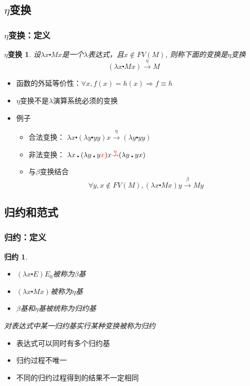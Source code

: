 \documentclass[CJK,compress,hyperref]{beamer}
\begin{document}
\begin{CJK}{UTF8}{song}
\subsection{ $\eta$变换}
\begin{frame}
  \frametitle{$\eta$变换：定义} 
  \newtheorem{etaRed}{$\eta$变换} 
  \begin{etaRed}
    设$\lambda x \centerdot Mx$是一个$\lambda$表达式，且$x \not \in FV(M)$, 则称下面的变换是{\color{red}$\eta$变换}
    \begin{displaymath}
      (\lambda x \centerdot Mx) \stackrel{\eta}{\longrightarrow} M 
    \end{displaymath} 
  \end{etaRed}
  \begin{itemize}
  \item 函数的外延等价性：$\forall x, f(x) = h(x) \Longrightarrow f \equiv h$  
  \item $\eta$变换不是$\lambda$演算系统必须的变换 
  \item 例子 
    \begin{itemize}
    \item{合法变换：} $\lambda x \centerdot (\lambda y \centerdot yy) x \stackrel{\eta}{\longrightarrow}(\lambda y \centerdot yy)$ 
    \item{非法变换：}  $\lambda x \centerdot (\lambda y \centerdot y{\color{red}x}) x {\color{red}\stackrel{\eta}{\nrightarrow}} (\lambda y \centerdot yx) $
    \item 与$\beta$变换结合
      \begin{displaymath}
        \forall y, x \not \in FV(M), (\lambda x \centerdot Mx)y \stackrel{\beta}{\longrightarrow} My
      \end{displaymath}
    \end{itemize}
  \end{itemize}
\end{frame} 

\subsection{ 归约和范式}
\begin{frame}
  \frametitle{归约：定义} 
  \newtheorem{reduction}{归约} 
  \begin{reduction} 
    \begin{itemize}
    \item $(\lambda x \centerdot E)E_0$被称为$\beta$基
    \item $(\lambda x \centerdot Mx)$被称为$\eta$基
    \item $\beta$基和$\eta$基被统称为归约基 
    \end{itemize} 
    对表达式中某一归约基实行某种变换被称为{\color{red}归约}
  \end{reduction} 
  \begin{itemize}
  \item 表达式可以同时有多个归约基 
  \item 归约过程不唯一
  \item {\color{red}不同的归约过程得到的结果不一定相同}
  \end{itemize}
\end{frame} 


\end{CJK}
\end{document}
